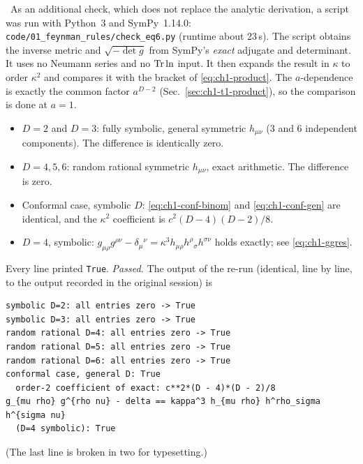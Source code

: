 \tC\ As an additional check, which does not replace the analytic derivation,
a script was run with Python~3 and SymPy~1.14.0:
\texttt{code/01\_feynman\_rules/check\_eq6.py} (runtime about 23\,s). The script
obtains the inverse metric and $\sqrt{-\det g}$ from SymPy's \emph{exact}
adjugate and determinant. It uses no Neumann series and no $\operatorname{Tr}\ln$ input.
It then expands the result in $\kappa$ to order $\kappa^2$ and compares it with
the bracket of \eqref{eq:ch1-product}. The $a$-dependence is exactly the common
factor $a^{D-2}$ (Sec.~\ref{sec:ch1-t1-product}), so the comparison is done at
$a=1$.
\begin{itemize}[leftmargin=1.4em]
\item $D=2$ and $D=3$: fully symbolic, general symmetric $h_{\mu\nu}$ (3 and 6
independent components). The difference is identically zero.
\item $D=4,5,6$: random rational symmetric $h_{\mu\nu}$, exact arithmetic. The
difference is zero.
\item Conformal case, symbolic $D$: \eqref{eq:ch1-conf-binom} and
\eqref{eq:ch1-conf-gen} are identical, and the $\kappa^2$ coefficient is
$c^2(D-4)(D-2)/8$.
\item $D=4$, symbolic: $g_{\mu\rho}g^{\rho\nu}-\delta_\mu{}^\nu=\kappa^3h_{\mu\rho}h^\rho{}_\sigma h^{\sigma\nu}$
holds exactly; see \eqref{eq:ch1-ggres}.
\end{itemize}
Every line printed \texttt{True}. \emph{Passed.} The output of the re-run
(identical, line by line, to the output recorded in the original session) is
\begin{center}
\begin{minipage}{0.97\linewidth}
\footnotesize
\begin{verbatim}
symbolic D=2: all entries zero -> True
symbolic D=3: all entries zero -> True
random rational D=4: all entries zero -> True
random rational D=5: all entries zero -> True
random rational D=6: all entries zero -> True
conformal case, general D: True
  order-2 coefficient of exact: c**2*(D - 4)*(D - 2)/8
g_{mu rho} g^{rho nu} - delta == kappa^3 h_{mu rho} h^rho_sigma h^{sigma nu}
  (D=4 symbolic): True
\end{verbatim}
\end{minipage}
\end{center}
(The last line is broken in two for typesetting.)

